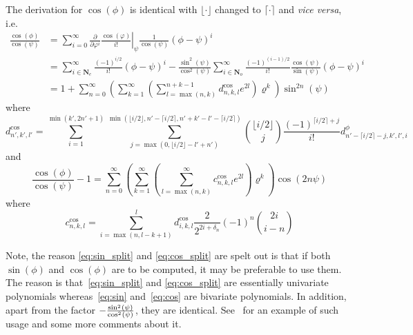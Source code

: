 \documentclass[a4paper]{amsart}
\begin{document}
The derivation for $\cos(\phi)$ is identical with $\lfloor\cdot\rfloor$ changed to $\lceil\cdot\rceil$ and \emph{vice versa}, i.e.
\begin{align}
\nonumber\frac{\cos(\phi)}{\cos(\psi)}&=\sum_{i=0}^\infty\frac{\partial}{\partial\varphi^i}\left.\frac{\cos(\varphi)}{i!}\right|_{\psi}\frac{1}{\cos(\psi)}(\phi-\psi)^i\\
\label{eq:cos_split}&=\sum_{i\in\mathbf{N}_e}^\infty\frac{(-1)^{i/2}}{i!}(\phi-\psi)^i-\frac{\sin^2(\psi)}{\cos^2(\psi)}\sum_{i\in\mathbf{N}_o}^\infty\frac{(-1)^{(i-1)/2}}{i!}\frac{\cos(\psi)}{\sin(\psi)}(\phi-\psi)^i\\
\label{eq:cos}&=1+\sum_{n=0}^\infty \left(\sum_{k=1}^\infty\left(\sum_{l=\max(n,k)}^{n+k-1} d^{\cos}_{n,k,l}e^{2l}\right)\varrho^k\right)\sin^{2n}(\psi)
\end{align}
where
\begin{equation}
d^{\cos}_{n',k',l'}=\sum_{i=1}^{\min(k',2n'+1)}\sum_{j=\max(0,\lfloor i/2\rfloor-l'+n')}^{\min(\lfloor i/2\rfloor,n'-\lceil i/2\rceil,n'+k'-l'-\lceil i/2\rceil)}\binom{\lfloor i/2\rfloor}{j}\frac{(-1)^{\lceil i/2\rceil+j}}{i!} d^\phi_{n'-\lceil i/2\rceil-j,k',l',i}\label{eq:d_cos}
\end{equation}
and
\begin{equation}
\frac{\cos(\phi)}{\cos(\psi)}-1=\sum_{n=0}^\infty\left( \sum_{k=1}^\infty\left(\sum_{l=\max(n,k)}^\infty c^{\cos}_{n,k,l}e^{2l}\right)\varrho^k\right)\cos(2n\psi)
\end{equation}
where
\begin{equation}
c^{\cos}_{n,k,l}=\sum_{i=\max(n,l-k+1)}^l d^{\cos}_{i,k,l}\frac{2}{2^{2i+\delta_n}}(-1)^{n}\binom{2i}{i-n}\label{eq:c_cos}
\end{equation}

Note, the reason \eqref{eq:sin_split} and \eqref{eq:cos_split} are spelt out is that if both $\sin(\phi)$ and $\cos(\phi)$ are to be computed, it may be preferable to use them. The reason is that~\eqref{eq:sin_split} and \eqref{eq:cos_split} are essentially univariate polynomials whereas~\eqref{eq:sin} and~\eqref{eq:cos} are bivariate polynomials. In addition, apart from the factor $-\tfrac{\smash{\sin^{{}_2}(\psi)}}{\smash{\cos^{{}_2}(\psi)}}$, they are identical. See~\cite{Nilsson2024minimax} for an example of such usage and some more comments about it.
\end{document}
